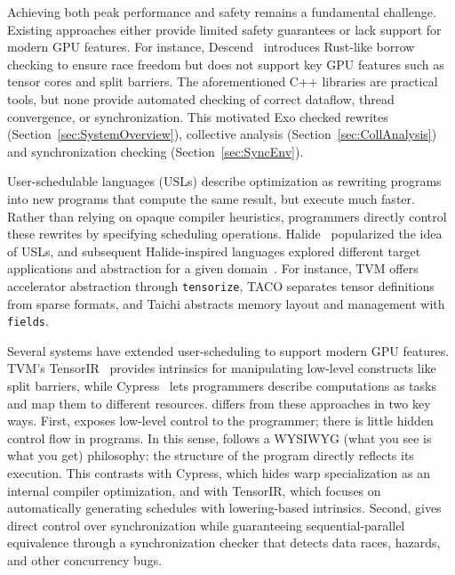 Achieving both peak performance and safety remains a fundamental challenge.
Existing approaches either provide limited safety guarantees or lack support for modern GPU features.
For instance, Descend~\cite{descend} introduces Rust-like borrow checking to ensure race freedom but does not support key GPU features such as tensor cores and split barriers.
The aforementioned C++ libraries are practical tools,
but none provide automated checking of correct dataflow, thread convergence, or synchronization.
%
This motivated Exo checked rewrites (Section~\ref{sec:SystemOverview}),
collective analysis (Section~\ref{sec:CollAnalysis})
and synchronization checking (Section~\ref{sec:SyncEnv}).


User-schedulable languages (USLs) describe optimization as rewriting programs into new programs that compute the same result, but execute much faster.
Rather than relying on opaque compiler heuristics,
programmers directly control these rewrites by specifying scheduling operations.
%
Halide~\cite{Halide:SIGGRAPH,Halide:CACM} popularized the idea of USLs, and subsequent Halide-inspired languages explored different target applications and abstraction for a given domain~\cite{Legion,TVM,TensorComprehensions,TACO,GraphIt,SWIRL,FireIron,Taichi,exo,lift2017}.
%
For instance, TVM offers accelerator abstraction through \texttt{tensorize}, TACO separates tensor definitions from sparse formats, and Taichi abstracts memory layout and management with \texttt{fields}.

Several systems have extended user-scheduling to support modern GPU features.\\
TVM's TensorIR~\cite{tensorir} provides intrinsics for manipulating low-level constructs like split barriers, while Cypress~\cite{cypress} lets programmers describe computations as tasks and map them to different resources.
%
\sporkName{} differs from these approaches in two key ways. First, \sporkName{} exposes low-level control to the programmer; there is little hidden control flow in \sporkName{} programs.
In this sense, \sporkName{} follows a WYSIWYG (what you see is what you get) philosophy: the structure of the program directly reflects its execution. This contrasts with Cypress, which hides warp specialization as an internal compiler optimization, and with TensorIR, which focuses on automatically generating schedules with lowering-based intrinsics.
Second, \sporkName{} gives direct control over synchronization while guaranteeing sequential-parallel equivalence through a synchronization checker that detects data races, hazards, and other concurrency bugs.

